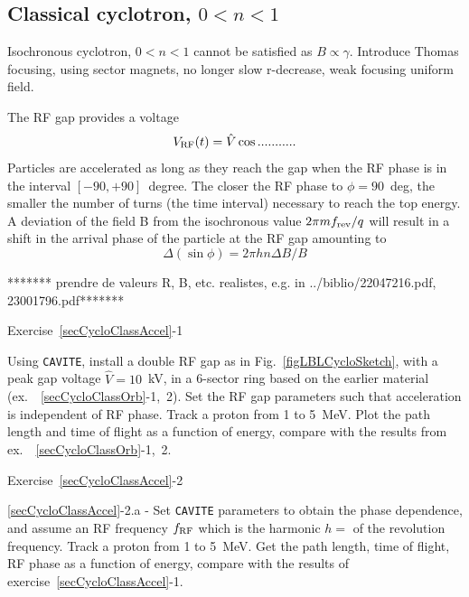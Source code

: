 \subsection{Classical cyclotron, $0<n<1$}


Isochronous cyclotron, $0<n<1$ cannot be satisfied as $B\propto \gamma$. Introduce Thomas focusing, using sector magnets,
no longer slow r-decrease, weak focusing uniform field.



The RF gap provides a voltage  
\begin{equation}
\label{EqRFVolt}
V_{\rm RF}(t) =\hat V \cos ........... 
\end{equation}
Particles are accelerated as long as they reach the gap when the RF phase is in the 
interval $[-90,+90]$~degree. 
The closer the RF phase to $\phi=90$~deg, the smaller the number of turns 
(the time interval) necessary to reach the top energy. 
A deviation of the field B from the isochronous value $2\pi m f_{\rm rev}/q$
will result in a  shift in the arrival phase of the particle at the RF gap amounting to 
\begin{equation}
\label{EqPFPhaseCyclo}
\Delta (\sin \phi) = 2\pi h n \Delta B/B
\end{equation}

 ******* prendre de valeurs R, B, etc. realistes, e.g. in ../biblio/22047216.pdf, 23001796.pdf*******

\smallskip
\noindent {\small $\bullet$} Exercise~\ref{secCycloClassAccel}-1 

Using \texttt{CAVITE}, install a double RF gap as in Fig.~\ref{figLBLCycloSketch}, 
with a peak gap voltage $\hat V = 10$~kV, in a 6-sector ring based on the earlier material (ex.~~\ref{secCycloClassOrb}-1,~2). 
Set the RF gap parameters such that acceleration is independent of RF phase.
Track a proton from 1 to 5~MeV. Plot the path length and time of flight as a function of energy, 
compare with the results from ex.~~\ref{secCycloClassOrb}-1,~2.


\smallskip
\noindent {\small $\bullet$} Exercise~\ref{secCycloClassAccel}-2 

\noindent \ref{secCycloClassAccel}-2.a - 
Set \texttt{CAVITE} parameters to obtain the phase dependence, 
and assume an RF frequency $f_{\rm RF}$ which is the harmonic $h=$ of the revolution frequency.
Track a proton from 1 to 5~MeV. 
Get the path length, time of flight, RF phase as a function of energy,
compare with the results of exercise~\ref{secCycloClassAccel}-1.

